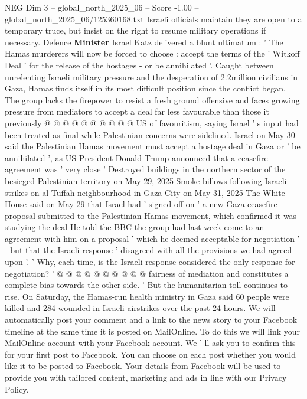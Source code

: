 \begin{textsample}{NEG Dim 3 – global\_north\_2025\_06 – Score -1.00 – global\_north\_2025\_06/125360168.txt}
Israeli officials maintain they are open to a temporary truce, but insist on the right to resume military operations if necessary.
Defence \textbf{Minister} Israel Katz delivered a blunt ultimatum : ' The Hamas murderers will now be forced to choose : accept the terms of the ' Witkoff Deal ' for the release of the hostages - or be annihilated '.
Caught between unrelenting Israeli military pressure and the desperation of 2.2million civilians in Gaza, Hamas finds itself in its most difficult position since the conflict began.
The group lacks the firepower to resist a fresh ground offensive and faces growing pressure from mediators to accept a deal far less favourable than those it previously @ @ @ @ @ @ @ @ @ @ US of favouritism, saying Israel ' s input had been treated as final while Palestinian concerns were sidelined.
Israel on May 30 said the Palestinian Hamas movement must accept a hostage deal in Gaza or ' be annihilated ', as US President Donald Trump announced that a ceasefire agreement was ' very close ' Destroyed buildings in the northern sector of the besieged Palestinian territory on May 29, 2025 Smoke billows following Israeli strikes on al-Tuffah neighbourhood in Gaza City on May 31, 2025 The White House said on May 29 that Israel had ' signed off on ' a new Gaza ceasefire proposal submitted to the Palestinian Hamas movement, which confirmed it was studying the deal He told the BBC the group had last week come to an agreement with him on a proposal ' which he deemed acceptable for negotiation ' - but that the Israeli response ' disagreed with all the provisions we had agreed upon '. ' Why, each time, is the Israeli response considered the only response for negotiation? ' @ @ @ @ @ @ @ @ @ @ fairness of mediation and constitutes a complete bias towards the other side. ' But the humanitarian toll continues to rise.
On Saturday, the Hamas-run health ministry in Gaza said 60 people were killed and 284 wounded in Israeli airstrikes over the past 24 hours.
We will automatically post your comment and a link to the news story to your Facebook timeline at the same time it is posted on MailOnline.
To do this we will link your MailOnline account with your Facebook account.
We ' ll ask you to confirm this for your first post to Facebook.
You can choose on each post whether you would like it to be posted to Facebook.
Your details from Facebook will be used to provide you with tailored content, marketing and ads in line with our Privacy Policy.

\end{textsample}
